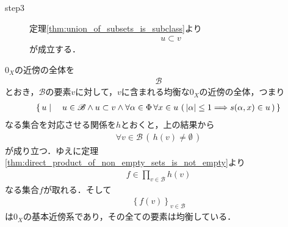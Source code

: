 \begin{sketch}
\begin{description}
			\item[step3] 定理\ref{thm:union_of_subsets_is_subclass}より
				\begin{align}
					u \subset v
				\end{align}
				が成立する．
		\end{description}
		$0_X$の近傍の全体を
		\begin{align}
			\mathscr{B}
		\end{align}
		とおき，$\mathscr{B}$の要素$v$に対して，$v$に含まれる均衡な$0_X$の近傍の全体，つまり
		\begin{align}
			\left\{\, u \mid \quad u \in \mathscr{B} \wedge u \subset v \wedge 
			\forall \alpha \in \Phi\, \forall x \in u\, \left(\, |\alpha| \leq 1 \Longrightarrow
			s(\alpha,x) \in u\, \right)\, \right\}
		\end{align}
		なる集合を対応させる関係を$h$とおくと，上の結果から
		\begin{align}
			\forall v \in \mathscr{B}\, \left(\, h(v) \neq \emptyset\, \right)
		\end{align}
		が成り立つ．ゆえに定理\ref{thm:direct_product_of_non_empty_sets_is_not_empty}より
		\begin{align}
			f \in \prod_{v \in \mathscr{B}} h(v)
		\end{align}
		なる集合$f$が取れる．そして
		\begin{align}
			\left\{f(v)\right\}_{v \in \mathscr{B}}
		\end{align}
		は$0_X$の基本近傍系であり，その全ての要素は均衡している．
		\QED
	\end{sketch}
	
